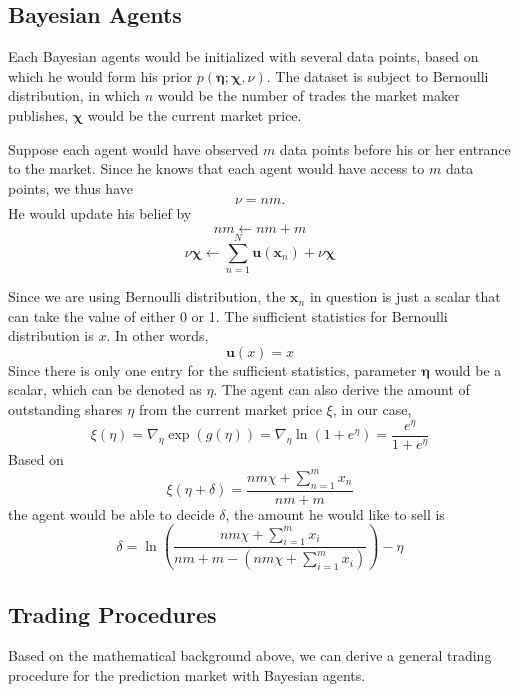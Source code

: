 \documentclass[12pt]{article}
\begin{document}
\subsection{Bayesian Agents}\label{Bayesian-agents}
Each Bayesian agents would be initialized with several data points, based on which he would form his prior $p(\boldsymbol{\eta}; \boldsymbol{\chi}, \nu)$. The dataset is subject to Bernoulli distribution, %
 in which $n$ would be the number of trades the market maker publishes, $\boldsymbol{\chi}$ would be the current market price.

Suppose each agent would have observed $m$ data points before his or her entrance to the market. Since he knows that each agent would have access to $m$ data points, we thus have $$\nu=nm.$$ He would update his belief by %
$$nm \leftarrow n m+m$$ $$\nu\bm{\chi} \leftarrow \sum_{n=1}^{N} \mathbf{u}\left(\mathbf{x}_{n}\right)+\nu \bm{\chi}$$

Since we are using Bernoulli distribution, the $\mathbf{x}_n$ in question is just a scalar that can take the value of either 0 or 1. The sufficient statistics for Bernoulli distribution is $x$. In other words,
\begin{displaymath}
\mathbf{u}(x) = x
\end{displaymath}
Since there is only one entry for the sufficient statistics, parameter $\boldsymbol{\eta}$ would be a scalar, which can be denoted as $\eta$. 
The agent can also derive the amount of outstanding shares $\eta$ from the current market price $\xi$, in our case, 
\begin{equation}
    \xi(\eta) = \nabla_{\eta}\exp{(g(\eta))}=\nabla_{\eta}\ln \left(1+e^{\eta}\right)=\frac{e^{\eta}}{1+e^{\eta}}
\end{equation}
Based on %
$$\xi(\eta+\delta)=\frac{n m \chi+\sum_{n=1}^{m}x_n}{n m+m}$$ the agent would be able to decide $\delta$, the amount he would like to sell is
\begin{equation}
    \delta=\ln{\left( \frac{n m \chi+\sum_{i=1}^{m}x_i}{n m+m-(n m \chi+\sum_{i=1}^{m}x_i)} \right)}-\eta
\end{equation}
\subsection{Trading Procedures}\label{trading-procedure}
Based on the mathematical background above, we can derive a general trading procedure for the prediction market with Bayesian agents.
\end{document}
